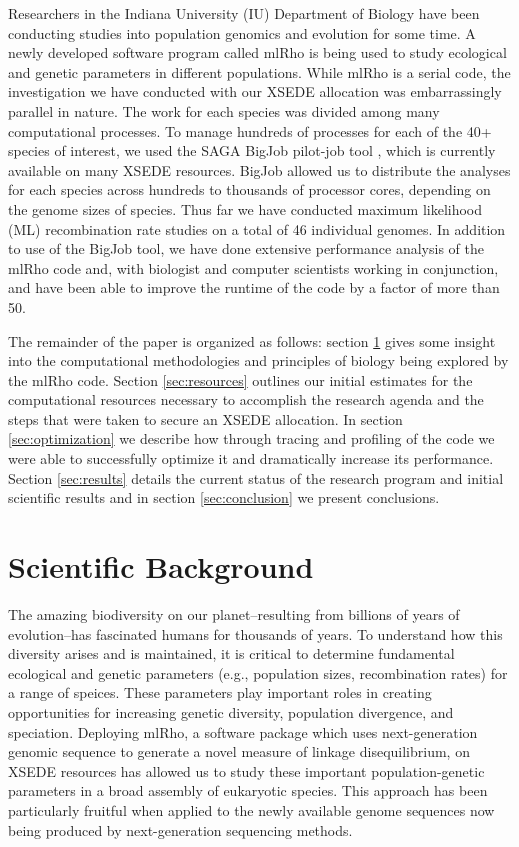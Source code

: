 \documentclass{sig-alternate}
\begin{document}
Researchers in the Indiana University (IU) Department of Biology have been conducting studies into population
genomics and evolution for some time. A newly developed software program called mlRho \cite{MEC:MEC4482} is
being used to study ecological and genetic parameters in different populations. While mlRho is a serial code,
the investigation we have conducted with our XSEDE allocation was embarrassingly parallel in nature. The work
for each species was divided among many computational processes. To manage hundreds of processes for each of
the 40+ species of interest, we used the SAGA BigJob pilot-job tool \cite{bigjob_web}, which is
currently available on many XSEDE resources. BigJob allowed us to distribute the analyses for each species
across hundreds to thousands of processor cores, depending on the genome sizes of species. Thus far we have
conducted maximum likelihood (ML) recombination rate studies on a total of 46 individual genomes. In addition
to use of the BigJob tool, we have done extensive performance analysis of the mlRho code and, with biologist
and computer scientists working in conjunction, and have been able to improve the runtime of the code by a
factor of more than 50.

The remainder of the paper is organized as follows: section \ref{sec:background} gives some insight into the
computational methodologies and principles of biology being explored by the mlRho code. Section
\ref{sec:resources} outlines our initial estimates for the computational resources necessary to accomplish the
research agenda and the steps that were taken to secure an XSEDE allocation. In section \ref{sec:optimization}
we describe how through tracing and profiling of the code we were able to successfully optimize it and
dramatically increase its performance. Section \ref{sec:results} details the current status of the research
program and initial scientific results and in section \ref{sec:conclusion} we present conclusions.


\section{Scientific Background}\label{sec:background}
The amazing biodiversity on our planet--resulting from billions of years of evolution--has fascinated humans for thousands of years. To understand how this diversity arises and is maintained, it is critical to determine fundamental ecological and genetic parameters (e.g., population sizes, recombination rates) for a range of speices. These parameters play important roles in creating opportunities for increasing genetic diversity, population divergence, and speciation. Deploying mlRho, a software package which uses next-generation genomic sequence to generate a novel measure of linkage disequilibrium, on XSEDE resources has allowed us to study these important population-genetic parameters in a broad assembly of eukaryotic species. This approach has been particularly fruitful when applied to the newly available genome sequences now being produced by next-generation sequencing methods. 
\end{document}
